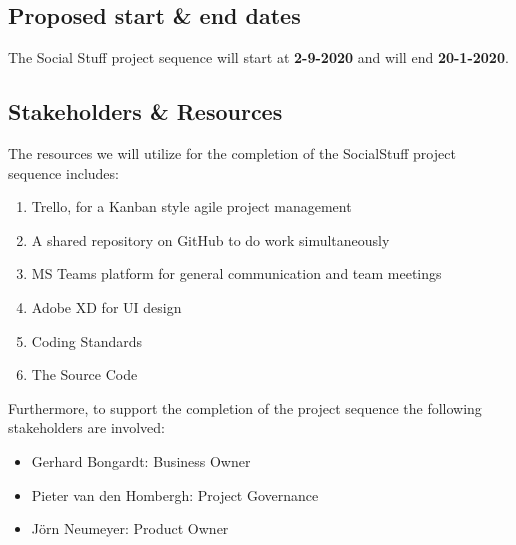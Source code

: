 \subsection{Proposed start \& end dates}\label{subsec:proposed-start-and-end-dates}

The Social Stuff project sequence will start at \textbf{2-9-2020} and will end \textbf{20-1-2020}.

\subsection{Stakeholders \& Resources}\label{subsec:stakeholders-and-resources}

The resources we will utilize for the completion of the SocialStuff project sequence includes:
\begin{enumerate}
    \item Trello, for a Kanban style agile project management
    \item A shared repository on GitHub to do work simultaneously
    \item MS Teams platform for general communication and team meetings
    \item Adobe XD for UI design
    \item Coding Standards
    \item The Source Code
\end{enumerate}

Furthermore, to support the completion of the project sequence the following stakeholders are involved:
\begin{itemize}
    \item Gerhard Bongardt: Business Owner
    \item Pieter van den Hombergh: Project Governance
    \item Jörn Neumeyer: Product Owner
\end{itemize}

